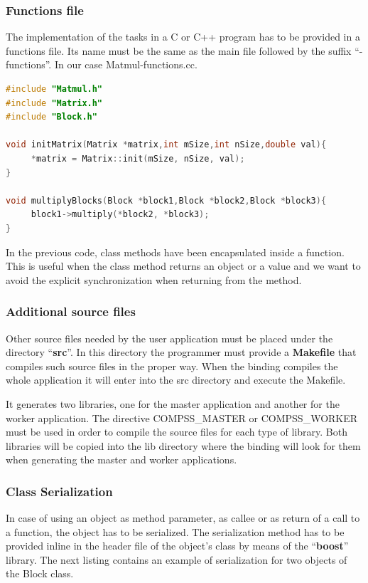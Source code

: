 \subsubsection{Functions file}
\label{sec:functionsfile}
The implementation of the tasks in a C or C++ program has to be provided in a functions file. 
Its name must be the same as the main file followed by the suffix ``-functions''. In our case Matmul-functions.cc.

\begin{lstlisting}[language=C++]
#include "Matmul.h"
#include "Matrix.h"
#include "Block.h"

void initMatrix(Matrix *matrix,int mSize,int nSize,double val){
     *matrix = Matrix::init(mSize, nSize, val);
}

void multiplyBlocks(Block *block1,Block *block2,Block *block3){
     block1->multiply(*block2, *block3);
}
\end{lstlisting}

In the previous code, class methods have been encapsulated inside a function. 
This is useful when the class method returns an object or a value and we want to avoid the explicit 
synchronization when returning from the method.

\subsubsection{Additional source files}
\label{sec:additionalsources}

Other source files needed by the user application must be placed under the directory ``{\bf src}''.
In this directory the programmer must provide a {\bf Makefile} that compiles such source files in the proper way. 
When the binding compiles the whole application it will enter into the src directory and execute the Makefile.
 
It generates two libraries, one for the master application and another for the worker application. 
The directive COMPSS\_MASTER or COMPSS\_WORKER must be used in order to compile the source files for each type of library. 
Both libraries will be copied into the lib directory where the binding will look for them when generating the master and worker applications.

\subsubsection{Class Serialization}
In case of using an object as method parameter, as callee or as return of a call to a function, the object has to be serialized. The serialization method has to be provided inline in the header file of the object's class by means of the ``{\bf boost}'' library. The next listing contains an example of serialization for two objects of the Block class.

